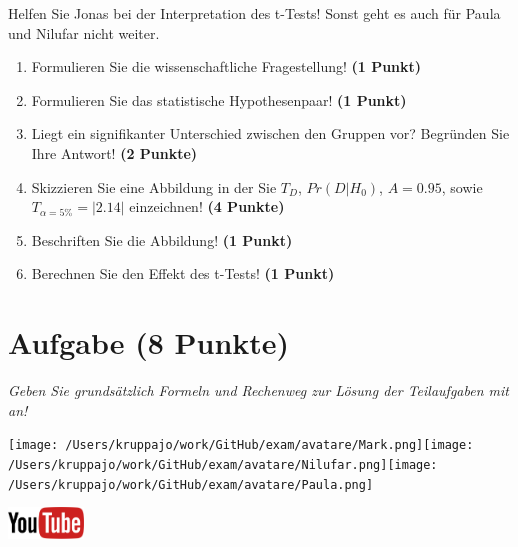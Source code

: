 \documentclass[a4paper, 9pt]{scrartcl}\usepackage[]{graphicx}\usepackage[]{xcolor}
\begin{document}
Helfen Sie Jonas bei der Interpretation des t-Tests! Sonst geht es auch für Paula und Nilufar nicht weiter.
  
\begin{enumerate}
  \item Formulieren Sie die wissenschaftliche Fragestellung! \textbf{(1 Punkt)}
  \item Formulieren Sie das statistische Hypothesenpaar! \textbf{(1 Punkt)}
\item Liegt ein signifikanter Unterschied zwischen den Gruppen vor? Begründen Sie Ihre Antwort! \textbf{(2 Punkte)}
\item Skizzieren Sie eine Abbildung in der Sie $T_{D}$, $Pr(D|H_0)$, $A=0.95$, sowie $T_{\alpha=5\%} = |2.14|$ einzeichnen! \textbf{(4 Punkte)}
\item Beschriften Sie die Abbildung! \textbf{(1 Punkt)}  
\item Berechnen Sie den Effekt des t-Tests! \textbf{(1 Punkt)}
\end{enumerate} 
\clearpage

\section{Aufgabe \hfill (8 Punkte)}

\textit{Geben Sie grundsätzlich Formeln und Rechenweg zur Lösung der Teilaufgaben mit an!} \\[1Ex]
 

 
\begin{minipage}[t]{0.5\textwidth}
\texttt{[image: /Users/kruppajo/work/GitHub/exam/avatare/Mark.png]}\hspace{-4mm}\texttt{[image: /Users/kruppajo/work/GitHub/exam/avatare/Nilufar.png]}\hspace{-4mm}\texttt{[image: /Users/kruppajo/work/GitHub/exam/avatare/Paula.png]}
\end{minipage}
\begin{minipage}[t]{0.5\textwidth}
\hfill
\href{https://youtu.be/wJqsNV1hOW8}{\includegraphics[width = 2cm]{img/youtube}}
\end{minipage}
\vspace{1ex}
\end{document}
